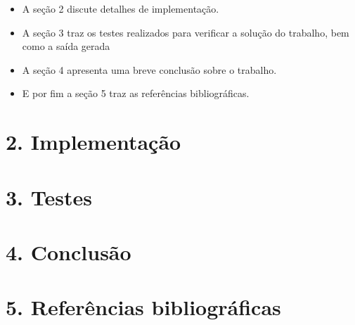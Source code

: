 \documentclass[12pt, a4paper]{article}
\begin{document}
  \begin{itemize}
  \item A seção 2 discute detalhes de implementação.
  \item A seção 3 traz os testes realizados para verificar a solução do trabalho, bem como a saída gerada
  \item A seção 4 apresenta uma breve conclusão sobre o trabalho.
  \item E por fim a seção 5 traz as referências bibliográficas.
\end{itemize}

\section*{2. Implementação}

\section*{3. Testes}

\section*{4. Conclusão}


\section*{5. Referências bibliográficas}
\end{document}
